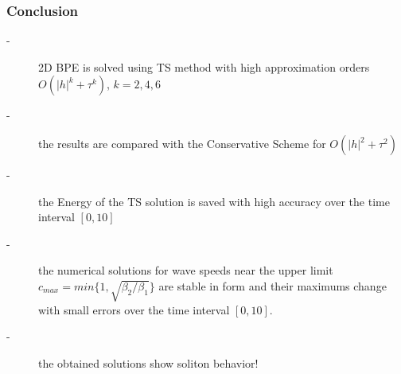 \documentclass{beamer}
\begin{document}
\begin{frame}
\frametitle{Conclusion}

\begin{description}
 \item[-] 2D BPE is solved using TS method with high approximation orders $O(|h|^k+\tau^k)$, $k=2,4,6$
 \item[-] the results are compared with the Conservative Scheme for $O(|h|^2+\tau^2)$
 \item[-] the Energy of the TS solution is saved with high accuracy over the time interval $[0, 10]$
 \item[-] the numerical solutions for wave speeds near the upper limit $c_{max} = min\{1, \sqrt{\beta_2/\beta_1} \}$ are stable in form and their maximums change with small errors over the time interval $[0, 10]$.
\item[-] the obtained solutions show soliton behavior!
\end{description}

\end{frame}

\end{document}
